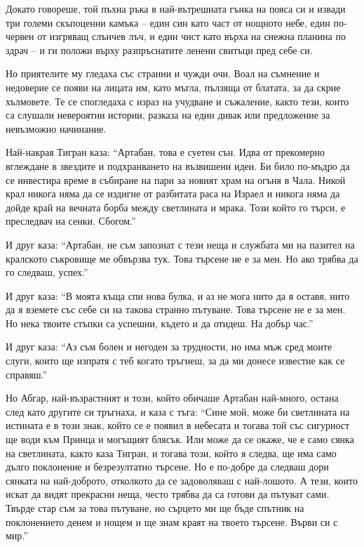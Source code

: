 \documentclass[oneside,10pt]{memoir}
\begin{document}
Докато говореше, той пъхна ръка в най-вътрешната гънка на пояса си и извади три
големи скъпоценни камъка -- един син като част от нощното небе, един по-червен
от изгряващ слънчев лъч, и един чист като върха на снежна планина по здрач -- и
ги положи върху разпръснатите ленени свитъци пред себе си.

Но приятелите му гледаха със странни и чужди очи. Воал на съмнение и недоверие
се появи на лицата им, като мъгла, пълзяща от блатата, за да скрие хълмовете. Те
се спогледаха с израз на учудване и съжаление, както тези, които са слушали
невероятни истории, разказа на един дивак или предложение за невъзможно
начинание.

Най-накрая Тигран каза: ``Артабан, това е суетен сън. Идва от прекомерно
вглеждане в звездите и подхранването на възвишени идеи. Би било по-мъдро да се
инвестира време в събиране на пари за новият храм на огъня в Чала. Никой крал
никога няма да се издигне от разбитата раса на Израел и никога няма да дойде
край на вечната борба между светлината и мрака. Този който го търси, е
преследвач на сенки. Сбогом.''

И друг каза: ``Артабан, не съм запознат с тези неща и службата ми на пазител на
кралското съкровище ме обвързва тук. Това търсене не е за мен. Но ако трябва да
го следваш, успех.''

И друг каза: ``В моята къща спи нова булка, и аз не мога нито да я оставя, нито
да я вземете със себе си на такова странно пътуване. Това търсене не е за мен.
Но нека твоите стъпки са успешни, където и да отидеш. На добър час.''

И друг каза: ``Аз съм болен и негоден за трудности, но има мъж сред моите слуги,
които ще изпратя с теб когато тръгнеш, за да ми донесе известие как се
справяш.''

Но Абгар, най-възрастният и този, който обичаше Артабан най-много, остана след
като другите си тръгнаха, и каза с тъга: ``Сине мой, може би светлината на
истината е в този знак, който се е появил в небесата и тогава той със сигурност
ще води към Принца и могъщият блясък. Или може да се окаже, че е само сянка на
светлината, както каза Тигран, и тогава този, който я следва, ще има само дълго
поклонение и безрезултатно търсене. Но е по-добре да следваш дори сянката на
най-доброто, отколкото да се задоволяваш с най-лошото. А тези, които искат да
видят прекрасни неща, често трябва да са готови да пътуват сами. Твърде стар съм
за това пътуване, но сърцето ми ще бъде спътник на поклонението денем и нощем и
ще знам краят на твоето търсене. Върви си с мир.''
\end{document}
